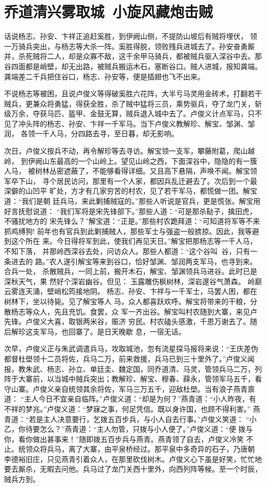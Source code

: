 \chapter{乔道清兴雾取城~小旋风藏炮击贼}

话说杨志、孙安、卞祥正追赶奚胜，到伊阙山侧，不提防山坡后有贼将埋伏，
领一万骑兵突出，与杨志等大杀一阵。奚胜得脱，领败残兵进城去了。孙安奋勇厮
并，杀死贼将二人，却是众寡不敌，这千余甲马骑兵，都被贼兵驱入深谷中去。那
谷四面都是峭壁，却无出路，被贼兵搬运木石，塞断谷口。贼人进城，报知龚端。
龚端差二千兵把住谷口，杨志、孙安等，便是插翅也飞不出来。

不说杨志等被困，且说卢俊义等得破奚胜六花阵，大半亏马灵用金砖术，打翻若干
贼兵，更兼众将勇猛，得获全胜，杀了贼中猛将三员，乘势驱兵，夺了龙门关，斩
级万余，夺获马匹、盔甲、金鼓无算，贼兵退入城中去了。卢俊义计点军马，只不
见了冲头阵的杨志、孙安、卞祥一千军马。当下卢俊义教解珍、解宝、邹渊、邹润，
各领一千人马，分四路去寻，至日暮，却无影响。

次日，卢俊义按兵不动，再令解珍等去寻访。解宝领一支军，攀藤附葛，爬山越岭，
到伊阙山东最高的一个山岭上。望见山岭之西，下面深谷中，隐隐的有一簇人马，
被树林丛密遮蔽了，不能够看得详细。又且高下悬隔，声唤不闻。解宝领军卒下山，
寻个居民访问，那里有一个人家，都因兵乱迁避去了。次后到一个最深僻的山凹平
旷处，方才有几家穷苦的村农，见了若干军马，都慌做一团。解宝道：“我们是朝
廷兵马，来此剿捕贼寇的。”那些人听说是官兵，更是慌张。解宝用好言抚慰说道：
“我们军将是宋先锋部下。”那些人道：“可是那杀鞑子，擒田虎，不骚扰地方的
宋先锋么？”解宝道：“正是。”那些村农跪拜道：“可知道将军等不来抓鸡缚狗!
前年也有官兵到此剿捕贼人，那些军士与强盗一般掳掠。因此，我等避到这个所在
来。今日得将军到此，使我们再见天日。”解宝把那杨志等一千人马，不知下落，
并那岭西深谷去处，问访众人。那些人都道：“这个谷叫谷，只有一条进去的
路。”农人遂引解宝等来到谷口，恰好邹渊、邹润两支军马，也寻到来。合兵一处，
杀散贼兵，一同上前，搬开木石，解宝、邹渊领兵马进谷。此时已是深秋天气，果
然好个深岩幽谷。但见：
玉露雕伤枫树林，深岩邃谷气萧森。
岭巅云雾连天涌，壁峭松筠接地阴。
杨志、孙安、卞祥与一千军士，马罢人困，都在树林下，坐以待毙。见了解宝等人
马，众人都喜跃欢呼。解宝将带来的干粮，分散杨志等众人，先且充饥。食罢，众
军一齐出谷。解宝叫村农随到大寨，来见卢先锋。卢俊义大喜，取银两米谷，赈济
穷民。村农磕头感激，千恩万谢去了。随后解珍这支军马，也回寨了。是日天晚歇
息，一宿无话。

次早，卢俊义正与朱武调遣兵马，攻取城池，忽有流星探马报将来说：“王庆差伪
都督杜壆领十二员将佐，兵马二万，前来救援，兵马已到三十里外了。”卢俊义闻
报，教朱武、杨志、孙立、单廷圭、魏定国，同乔道清、马灵，管领兵马二万，列
阵于大寨前，以当城中贼兵突出；教解珍、解宝、穆春、薛永，管领军马五千，看
守山寨。卢俊义亲自统领其余将佐，军马三万五千，迎敌杜壆。当有浪子燕青禀道：
“主人今日不宜亲自临阵。”卢俊义道：“却是为何？”燕青道：“小人昨夜，有
不祥的梦兆。”卢俊义道：“梦寐之事，何足凭信。既以身许国，也顾不得利害。”
燕青道：“若是主人决意要行，乞拨五百步兵，与小人自去行事。”卢俊义笑道：
“小乙，你待要怎么？”燕青道：“主人勿管，只拨与小人便了。”卢俊义道：“便
拨与你，看你做出甚事来！”随即拨五百步兵与燕青。燕青领了自去，卢俊义冷笑
不止。统领众将兵马，离了大寨，由平泉桥经过。那平泉中多奇异的石子，乃唐朝
李德裕旧庄，只见燕青引着众人，在那里砍伐树木。卢俊义心下虽是好笑，忙忙地
要去厮杀，无暇去问他。兵马过了龙门关西十里外，向西列阵等候。至一个时辰，
贼兵方到。

